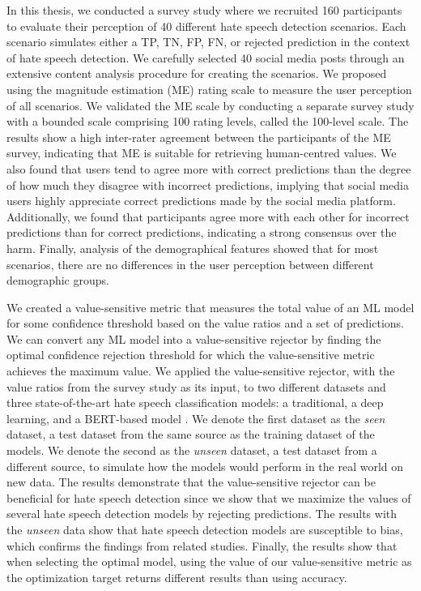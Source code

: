 %
In this thesis, we conducted a survey study where we recruited 160 participants to evaluate their perception of 40 different hate speech detection scenarios.
%
Each scenario simulates either a TP, TN, FP, FN, or rejected prediction in the context of hate speech detection.
%
We carefully selected 40 social media posts through an extensive content analysis procedure for creating the scenarios.
%
We proposed using the magnitude estimation (ME) rating scale to measure the user perception of all scenarios.
%
We validated the ME scale by conducting a separate survey study with a bounded scale comprising 100 rating levels, called the 100-level scale.
%
The results show a high inter-rater agreement between the participants of the ME survey, indicating that ME is suitable for retrieving human-centred values.
%
We also found that users tend to agree more with correct predictions than the degree of how much they disagree with incorrect predictions, implying that social media users highly appreciate correct predictions made by the social media platform.
%
Additionally, we found that participants agree more with each other for incorrect predictions than for correct predictions, indicating a strong consensus over the harm.
%
Finally, analysis of the demographical features showed that for most scenarios, there are no differences in the user perception between different demographic groups.
%

%
We created a value-sensitive metric that measures the total value of an ML model for some confidence threshold based on the value ratios and a set of predictions.
%
We can convert any ML model into a value-sensitive rejector by finding the optimal confidence rejection threshold for which the value-sensitive metric achieves the maximum value.
%
We applied the value-sensitive rejector, with the value ratios from the survey study as its input, to two different datasets and three state-of-the-art hate speech classification models: a traditional, a deep learning, and a BERT-based model \citep{devlin2018bert}.
%
We denote the first dataset as the \emph{seen} dataset, a test dataset from the same source as the training dataset of the models.
%
We denote the second as the \emph{unseen} dataset, a test dataset from a different source, to simulate how the models would perform in the real world on new data.
%
The results demonstrate that the value-sensitive rejector can be beneficial for hate speech detection since we show that we maximize the values of several hate speech detection models by rejecting predictions.
%
The results with the \emph{unseen} data show that hate speech detection models are susceptible to bias, which confirms the findings from related studies.
%
Finally, the results show that when selecting the optimal model, using the value of our value-sensitive metric as the optimization target returns different results than using accuracy.
%

